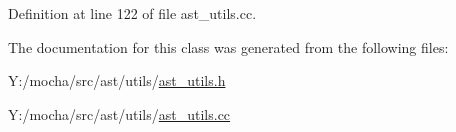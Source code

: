 Definition at line 122 of file ast\_\-utils.cc.



The documentation for this class was generated from the following files:\begin{DoxyCompactItemize}
\item 
Y:/mocha/src/ast/utils/\hyperlink{ast__utils_8h}{ast\_\-utils.h}\item 
Y:/mocha/src/ast/utils/\hyperlink{ast__utils_8cc}{ast\_\-utils.cc}\end{DoxyCompactItemize}

